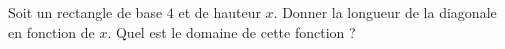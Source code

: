 
\begin{exercice}\label{exoSeconde-0076}

Soit un rectangle de base \( 4\) et de hauteur \( x\). Donner la longueur de la diagonale en fonction de \( x\). Quel est le domaine de cette fonction ?

\end{exercice}
